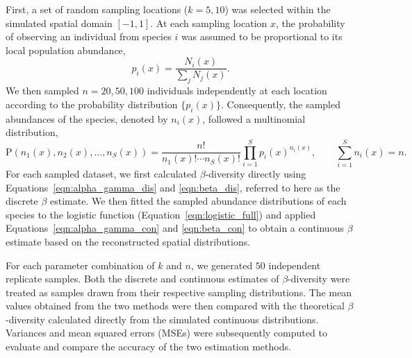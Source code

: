     First, a set of random sampling locations ($k = 5, 10$) was selected within the simulated spatial domain $[-1,1]$. At each sampling location $x$, the probability of observing an individual from species $i$ was assumed to be proportional to its local population abundance,
    \begin{equation*}
        p_i(x) = \frac{N_i(x)}{\sum_j N_j(x)}.
    \end{equation*}
    We then sampled $n = 20, 50, 100$ individuals independently at each location according to the probability distribution $\{p_i(x)\}$. Consequently, the sampled abundances of the species, denoted by $n_i(x)$, followed a multinomial distribution,
    \begin{equation*}
        \mathrm{P}\left(n_1(x), n_2(x), \dots, n_S(x)\right) 
        = \frac{n!}{n_1(x)! \cdots n_S(x)!} 
        \prod_{i=1}^{S} p_i(x)^{n_i(x)},
        \qquad
        \sum_{i=1}^{S} n_i(x) = n.
    \end{equation*}
    For each sampled dataset, we first calculated $\beta$-diversity directly using Equations~\ref{eqn:alpha_gamma_dis} and \ref{eqn:beta_dis}, referred to here as the discrete $\beta$ estimate. We then fitted the sampled abundance distributions of each species to the logistic function (Equation~\ref{eqn:logistic_full}) and applied Equations~\ref{eqn:alpha_gamma_con} and \ref{eqn:beta_con} to obtain a continuous $\beta$ estimate based on the reconstructed spatial distributions.

    For each parameter combination of $k$ and $n$, we generated $50$ independent replicate samples. Both the discrete and continuous estimates of $\beta$-diversity were treated as samples drawn from their respective sampling distributions. The mean values obtained from the two methods were then compared with the theoretical $\beta$-diversity calculated directly from the simulated continuous distributions. Variances and mean squared errors (MSEs) were subsequently computed to evaluate and compare the accuracy of the two estimation methods.
